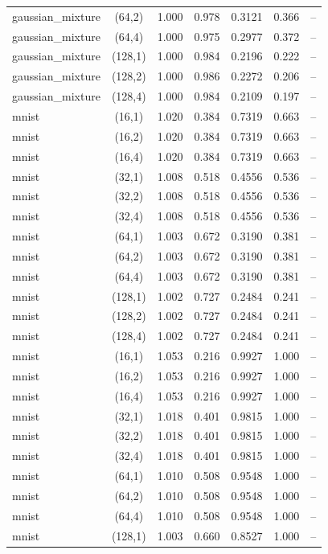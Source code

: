 \begin{tabular}{lcccccc}
gaussian\_mixture & (64,2) & 1.000 & 0.978 & 0.3121 & 0.366 & -- \\
gaussian\_mixture & (64,4) & 1.000 & 0.975 & 0.2977 & 0.372 & -- \\
gaussian\_mixture & (128,1) & 1.000 & 0.984 & 0.2196 & 0.222 & -- \\
gaussian\_mixture & (128,2) & 1.000 & 0.986 & 0.2272 & 0.206 & -- \\
gaussian\_mixture & (128,4) & 1.000 & 0.984 & 0.2109 & 0.197 & -- \\
mnist & (16,1) & 1.020 & 0.384 & 0.7319 & 0.663 & -- \\
mnist & (16,2) & 1.020 & 0.384 & 0.7319 & 0.663 & -- \\
mnist & (16,4) & 1.020 & 0.384 & 0.7319 & 0.663 & -- \\
mnist & (32,1) & 1.008 & 0.518 & 0.4556 & 0.536 & -- \\
mnist & (32,2) & 1.008 & 0.518 & 0.4556 & 0.536 & -- \\
mnist & (32,4) & 1.008 & 0.518 & 0.4556 & 0.536 & -- \\
mnist & (64,1) & 1.003 & 0.672 & 0.3190 & 0.381 & -- \\
mnist & (64,2) & 1.003 & 0.672 & 0.3190 & 0.381 & -- \\
mnist & (64,4) & 1.003 & 0.672 & 0.3190 & 0.381 & -- \\
mnist & (128,1) & 1.002 & 0.727 & 0.2484 & 0.241 & -- \\
mnist & (128,2) & 1.002 & 0.727 & 0.2484 & 0.241 & -- \\
mnist & (128,4) & 1.002 & 0.727 & 0.2484 & 0.241 & -- \\
mnist & (16,1) & 1.053 & 0.216 & 0.9927 & 1.000 & -- \\
mnist & (16,2) & 1.053 & 0.216 & 0.9927 & 1.000 & -- \\
mnist & (16,4) & 1.053 & 0.216 & 0.9927 & 1.000 & -- \\
mnist & (32,1) & 1.018 & 0.401 & 0.9815 & 1.000 & -- \\
mnist & (32,2) & 1.018 & 0.401 & 0.9815 & 1.000 & -- \\
mnist & (32,4) & 1.018 & 0.401 & 0.9815 & 1.000 & -- \\
mnist & (64,1) & 1.010 & 0.508 & 0.9548 & 1.000 & -- \\
mnist & (64,2) & 1.010 & 0.508 & 0.9548 & 1.000 & -- \\
mnist & (64,4) & 1.010 & 0.508 & 0.9548 & 1.000 & -- \\
mnist & (128,1) & 1.003 & 0.660 & 0.8527 & 1.000 & -- \\

\end{tabular}
